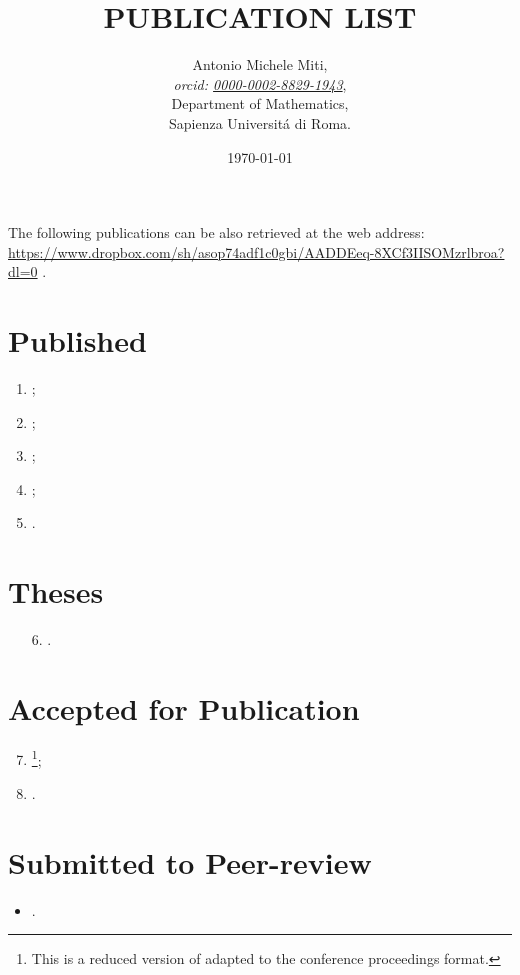 \documentclass[a4paper]{article}
\title{PUBLICATION LIST}
\date{\today}
\author{
	Antonio Michele Miti,\\
	\emph{orcid: \href{https://orcid.org/0000-0002-8829-1943}{0000-0002-8829-1943}},
	\\
	Department of Mathematics,\\
	Sapienza Universit\'a di Roma.
}
\begin{document}
  

	\maketitle

	\noindent
  The following publications can be also retrieved at the web address:
  \\ 
  \url{https://www.dropbox.com/sh/asop74adf1c0gbi/AADDEeq-8XCf3IISOMzrlbroa?dl=0}
  .


  \section*{Published}
	  \begin{enumerate}
 	   \item {};	  
	   \item {};		
 	   \item {};
 	   \item {};
 	   \item {}.
	  \end{enumerate}

  \section*{Theses}
	  \begin{enumerate}
		\setcounter{enumi}{5}
 	   \item[6.] .
	  \end{enumerate}

  \section*{Accepted for Publication}
	  \begin{enumerate}
		\setcounter{enumi}{6}
		\item {}\footnote{This is a reduced version of \cite{Luongo2024} adapted to the conference proceedings format.};
    	\item {}.
	  \end{enumerate}

  \section*{Submitted to Peer-review}
	  \begin{itemize}
    	   \item {}.
	  \end{itemize}
\end{document}

